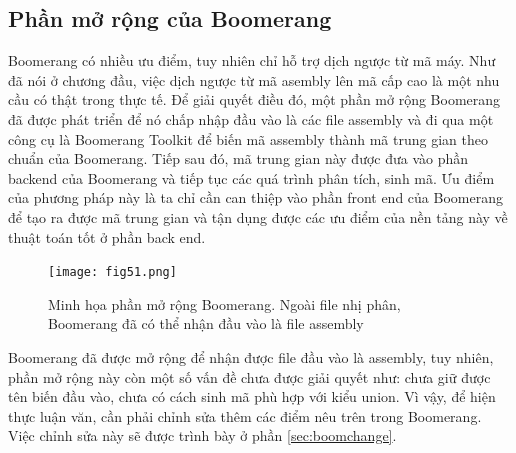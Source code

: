 \subsection{Phần mở rộng của Boomerang}

Boomerang có nhiều ưu điểm, tuy nhiên chỉ hỗ trợ dịch ngược từ mã máy. Như đã nói ở chương đầu, việc dịch ngược từ mã asembly lên mã cấp cao là một nhu cầu có thật trong thực tế. Để giải quyết điều đó, một phần mở rộng Boomerang \cite{lvtn} đã được phát triển để nó chấp nhập đầu vào là các file assembly và đi qua một công cụ là Boomerang Toolkit để biến mã assembly thành mã trung gian theo chuẩn của Boomerang. Tiếp sau đó, mã trung gian này được đưa vào phần backend của Boomerang và tiếp tục các quá trình phân tích, sinh mã. Ưu điểm của phương pháp này là ta chỉ cần can thiệp vào phần front end của Boomerang để tạo ra được mã trung gian và tận dụng được các ưu điểm của nền tảng này về thuật toán tốt ở phần back end.\\

\begin{figure}[h]
	\centering
	\texttt{[image: fig51.png]}
	\caption{Minh họa phần mở rộng Boomerang. Ngoài file nhị phân, Boomerang đã có thể nhận đầu vào là file assembly}
\end{figure}

Boomerang đã được mở rộng để nhận được file đầu vào là assembly, tuy nhiên, phần mở rộng này còn một số vấn đề chưa được giải quyết như: chưa giữ được tên biến đầu vào, chưa có cách sinh mã phù hợp với kiểu union. Vì vậy, để hiện thực luận văn, cần phải chỉnh sửa thêm các điểm nêu trên trong Boomerang. Việc chỉnh sửa này sẽ được trình bày ở phần \ref{sec:boomchange}.
